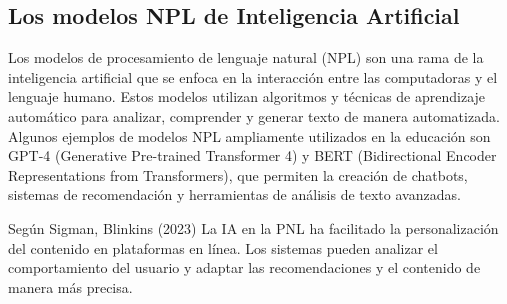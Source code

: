   \subsection{Los modelos NPL de Inteligencia Artificial}

  Los modelos de procesamiento de lenguaje natural (NPL) son una rama de la inteligencia artificial que se enfoca en la interacción entre las computadoras y el lenguaje humano. Estos modelos utilizan algoritmos y técnicas de aprendizaje automático para analizar, comprender y generar texto de manera automatizada. Algunos ejemplos de modelos NPL ampliamente utilizados en la educación son GPT-4 (Generative Pre-trained Transformer 4) y BERT (Bidirectional Encoder Representations from Transformers), que permiten la creación de chatbots, sistemas de recomendación y herramientas de análisis de texto avanzadas.

  Según Sigman, Blinkins (2023) La  IA  en  la  PNL  ha  facilitado  la  personalización  del  contenido  en  plataformas  en línea.   Los   sistemas   pueden   analizar   el   comportamiento   del   usuario   y   adaptar   las recomendaciones y el contenido de manera más precisa.